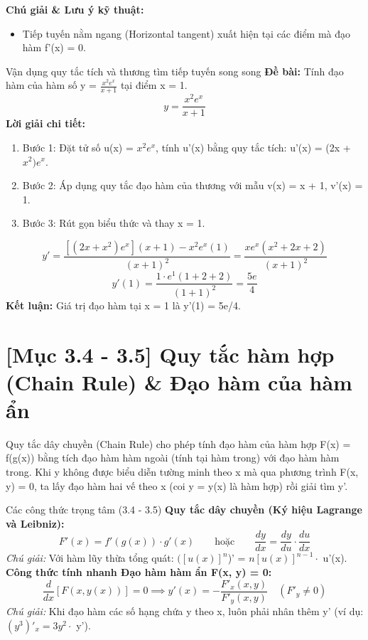 \documentclass[11pt,a4paper,oneside]{book}
\begin{document}
\noindent\textbf{Chú giải \& Lưu ý kỹ thuật:}
\begin{itemize}[leftmargin=1.5em, itemsep=2pt]
  \item Tiếp tuyến nằm ngang (Horizontal tangent) xuất hiện tại các điểm mà đạo hàm f'(x) = 0.
\end{itemize}

\begin{vidu}{Vận dụng quy tắc tích và thương tìm tiếp tuyến song song}
\textbf{Đề bài:} Tính đạo hàm của hàm số y = $\frac{x^2 e^x}{x + 1}$ tại điểm x = 1.
\[ y = \frac{x^2 e^x}{x + 1} \]
\textbf{Lời giải chi tiết:}
\begin{enumerate}[leftmargin=1.5em, itemsep=2pt]
  \item Bước 1: Đặt tử số u(x) = $x^2 e^x$, tính u'(x) bằng quy tắc tích: u'(x) = (2x + $x^2 )e^x$.
  \item Bước 2: Áp dụng quy tắc đạo hàm của thương với mẫu v(x) = x + 1, v'(x) = 1.
  \item Bước 3: Rút gọn biểu thức và thay x = 1.
\end{enumerate}
\[ y' = \frac{[(2x + x^2)e^x](x + 1) - x^2 e^x (1)}{(x + 1)^2} = \frac{x e^x (x^2 + 2x + 2)}{(x + 1)^2} \]
\[ y'(1) = \frac{1 \cdot e^1 (1 + 2 + 2)}{(1 + 1)^2} = \frac{5e}{4} \]
\noindent\textbf{Kết luận:} Giá trị đạo hàm tại x = 1 là y'(1) = 5e/4.
\end{vidu}

\section{[Mục 3.4 - 3.5] Quy tắc hàm hợp (Chain Rule) \& Đạo hàm của hàm ẩn}
Quy tắc dây chuyền (Chain Rule) cho phép tính đạo hàm của hàm hợp F(x) = f(g(x)) bằng tích đạo hàm hàm ngoài (tính tại hàm trong) với đạo hàm hàm trong. Khi y không được biểu diễn tường minh theo x mà qua phương trình F(x, y) = 0, ta lấy đạo hàm hai vế theo x (coi y = y(x) là hàm hợp) rồi giải tìm y'.

\begin{congthuc}{Các công thức trọng tâm (3.4 - 3.5)}
\noindent\textbf{Quy tắc dây chuyền (Ký hiệu Lagrange và Leibniz):}
\[ F'(x) = f'(g(x)) \cdot g'(x) \qquad \text{hoặc} \qquad \frac{dy}{dx} = \frac{dy}{du} \cdot \frac{du}{dx} \]
\noindent\textit{Chú giải:} Với hàm lũy thừa tổng quát: $([u(x)]^n$)' = $n[u(x)]^{n-1} \cdot$  u'(x).\\[4pt]
\noindent\textbf{Công thức tính nhanh Đạo hàm hàm ẩn F(x, y) = 0:}
\[ \frac{d}{dx}[F(x, y(x))] = 0 \implies y'(x) = -\frac{F'_x(x, y)}{F'_y(x, y)} \quad (F'_y \neq 0) \]
\noindent\textit{Chú giải:} Khi đạo hàm các số hạng chứa y theo x, luôn phải nhân thêm y' (ví dụ: $(y^3 )'_x = 3y^2 \cdot$  y').\\[4pt]
\end{congthuc}
\end{document}
